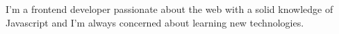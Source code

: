 

\begin{cvparagraph}

I'm a frontend developer passionate about the web with a solid knowledge of Javascript and I’m always concerned about learning new technologies.
\end{cvparagraph}
